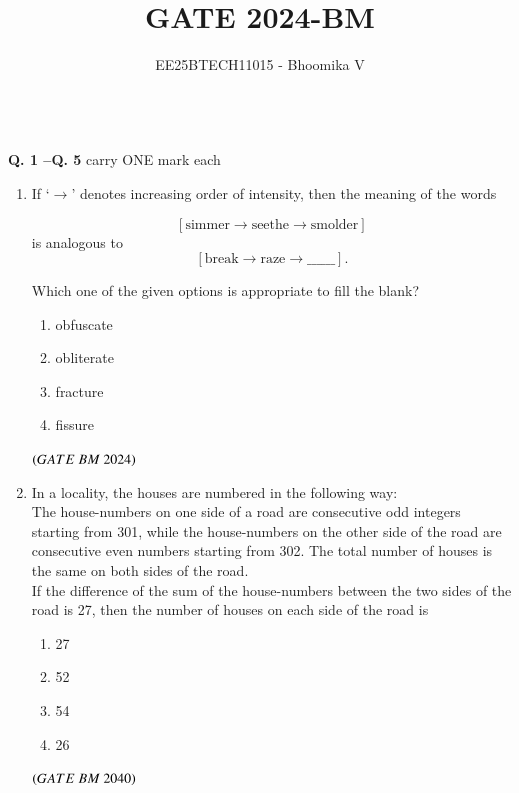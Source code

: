 \documentclass[journal,12pt,onecolumn]{IEEEtran}
\theoremstyle{remark}
\begin{document}
\title{GATE 2024-BM}
\author{EE25BTECH11015 - Bhoomika V}
\maketitle
\renewcommand{\thefigure}{\theenumi}
\renewcommand{\thetable}{\theenumi}

\\

\noindent \textbf{Q. 1 --Q.  \textbf{5}} carry ONE mark each
\begin{enumerate}

\item If `$\rightarrow$' denotes increasing order of intensity, then the meaning of the words  

\[
[\text{simmer} \rightarrow \text{seethe} \rightarrow \text{smolder}]
\] is analogous to  \[
[\text{break} \rightarrow \text{raze} \rightarrow \_\_\_\_\_\_ ].
\]

Which one of the given options is appropriate to fill the blank? 
\begin{enumerate}[label=(\Alph*)] 
    \item obfuscate
    \item obliterate
    \item fracture
    \item fissure
\end{enumerate}
\hfill $\brak{GATE\ BM\ 2024}$

\item In a locality, the houses are numbered in the following way:\\

The house-numbers on one side of a road are consecutive odd integers starting from
301, while the house-numbers on the other side of the road are consecutive even
numbers starting from 302. The total number of houses is the same on both sides of
the road.\\

If the difference of the sum of the house-numbers between the two sides of the road
is 27, then the number of houses on each side of the road is
\begin{enumerate}[label=(\Alph*)] 
    \item 27
    \item 52
    \item 54
    \item 26
\end{enumerate}
\hfill $\brak{GATE\ BM\ 2040}$


\end{enumerate}
\end{document}
